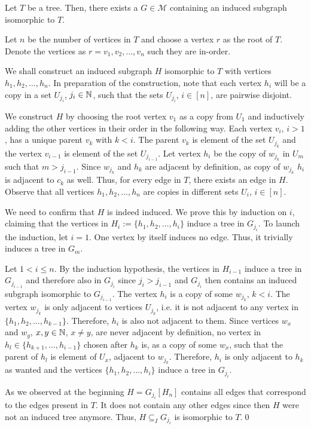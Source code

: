 \begin{thm}
Let $T$ be a tree. Then, there exists a $G\in\mathcal{M}$ containing an induced subgraph isomorphic to $T$.
\end{thm}
\begin{prf}
Let $n$ be the number of vertices in $T$ and choose a vertex $r$ as the root of $T$. Denote the vertices as $r=v_1, v_2, \dots , v_n$ such they are in-order.

We shall construct an induced subgraph $H$ isomorphic to $T$ with vertices $h_1, h_2, \dots , h_n$. In preparation of the construction, note that each vertex $h_i$ will be a copy in a set $U_{j_i}$, $j_i\in\mathbb{N}$, such that the sets $U_{j_i}$, $i\in [n]$, are pairwise disjoint.

We construct $H$ by choosing the root vertex $v_1$ as a copy from $U_1$ and inductively adding the other vertices in their order in the following way. Each vertex $v_i$, $i>1$, has a unique parent $v_k$ with $k<i$. The parent $v_k$ is element of the set $U_{j_k}$ and the vertex $v_{i-1}$ is element of the set $U_{j_{i-1}}$. Let vertex $h_i$ be the copy of $w_{j_k}$ in $U_m$ such that $m> j_{i-1}$. Since $w_{j_k}$ and $h_k$ are adjacent by definition, as copy of $w_{j_k}$ $h_i$ is adjacent to $c_k$ as well. Thus, for every edge in $T$, there exists an edge in $H$. Observe that all vertices $h_1, h_2, \dots , h_n$ are copies in different sets $U_i$, $i\in [n]$. 

We need to confirm that $H$ is indeed induced. We prove this by induction on $i$, claiming that the vertices in $H_i:=\lbrace h_1, h_2, \dots , h_i\rbrace$ induce a tree in $G_{j_i}$. To launch the induction, let $i=1$. One vertex by itself induces no edge. Thus, it trivially induces a tree in $G_m$.

Let $1<i\leq n$. By the induction hypothesis, the vertices in $H_{i-1}$ induce a tree in $G_{j_{i-1}}$ and therefore also in $G_{j_i}$ since $j_i >j_{i-1}$ and $G_{j_i}$ then contains an induced subgraph isomorphic to $G_{j_{i-1}}$. The vertex $h_i$ is a copy of some $w_{j_k}$, $k<i$. The vertex $w_{j_k}$ is only adjacent to vertices $U_{j_k}$, i.e. it is not adjacent to any vertex in $\lbrace h_1, h_2, \dots , h_{k-1}\rbrace$. Therefore, $h_i$ is also not adjacent to them. Since vertices $w_x$ and $w_y$, $x,y\in\mathbb{N}$, $x\neq y$, are never adjacent by definition, no vertex in $h_l\in\lbrace h_{k+1}, \dots , h_{i-1}\rbrace$ chosen after $h_k$ is, as a copy of some $w_x$, such that the parent of $h_l$ is element of $U_x$, adjacent to $w_{j_k}$. Therefore, $h_i$ is only adjacent to $h_k$ as wanted and the vertices $\lbrace h_1, h_2, \dots , h_i\rbrace$ induce a tree in $G_{j_i}$.

As we observed at the beginning $H=G_{j_i}[H_n]$ contains all edges that correspond to the edges present in $T$. It does not contain any other edges since then $H$ were not an induced tree anymore. Thus, $H\subseteq_I G_{j_i}$ is isomorphic to $T$.\qed
\end{prf}
